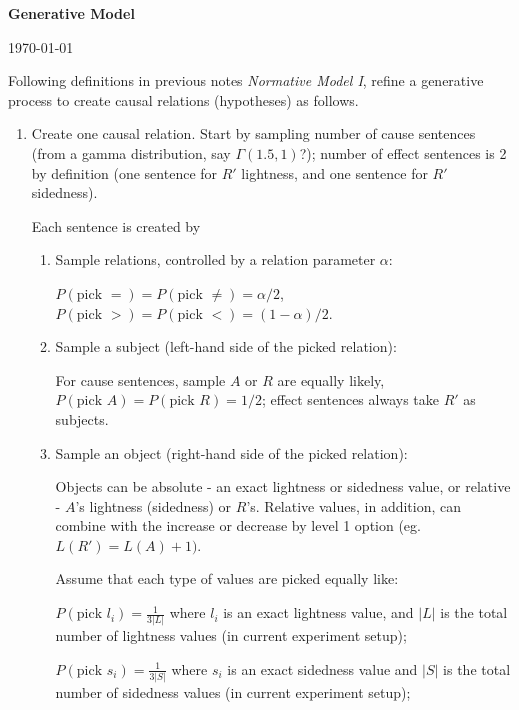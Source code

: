 \documentclass[11pt]{article}
\begin{document}

\begin{center}
{\bf Generative Model}

{\normalsize \today}
\end{center}



Following definitions in previous notes \textit{Normative Model I},
refine a generative process to create causal relations (hypotheses) as follows.

\begin{enumerate}
\item Create one causal relation.
Start by sampling number of cause sentences (from a gamma distribution, say $\Gamma(1.5, 1)$?);
number of effect sentences is 2 by definition 
(one sentence for $R'$ lightness, and one sentence for $R'$ sidedness).

Each sentence is created by

\begin{enumerate}
	\item Sample relations, controlled by a relation parameter $\alpha$:

	$P(\text{pick }=) = P(\text{pick }\neq) = \alpha/2$, 
	$P(\text{pick }>) = P(\text{pick }<) = (1-\alpha)/2$.

	\item Sample a subject (left-hand side of the picked relation):

	For cause sentences, sample $A$ or $R$ are equally likely, 
	$P(\text{pick }A) = P(\text{pick }R) = 1/2$;
	effect sentences always take $R'$ as subjects.

	\item Sample an object (right-hand side of the picked relation):

	Objects can be absolute - an exact lightness or sidedness value,
	or relative - $A$'s lightness (sidedness) or $R$'s.
	Relative values, in addition, can combine with the increase or decrease by level 1 option (eg. $L(R')=L(A)+1)$.

	Assume that each type of values are picked equally like:

	$P(\text{pick }l_i) = \frac{1}{3|L|}$ 
	where $l_i$ is an exact lightness value, 
	and $|L|$ is the total number of lightness values (in current experiment setup);

	$P(\text{pick }s_i) = \frac{1}{3|S|}$
	where $s_i$ is an exact sidedness value
	and $|S|$ is the total number of sidedness values (in current experiment setup);


\end{enumerate}
\end{enumerate}
\end{document}
